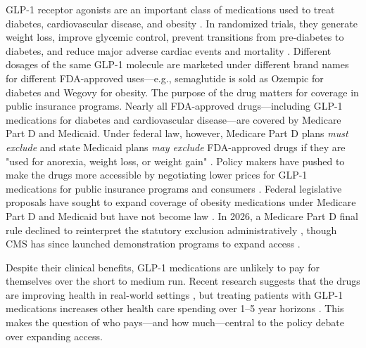 GLP-1 receptor agonists are an important class of medications used to treat diabetes, cardiovascular disease, and obesity \citep{Drucker2018}. In randomized trials, they generate weight loss, improve glycemic control, prevent transitions from pre-diabetes to diabetes, and reduce major adverse cardiac events and mortality \citep{Drucker2018, Marso2016a, Wilding2021, Jastreboff2022, lincoff2023semaglutide, le2017liraglutide, kahn2024semaglutide, jastreboff2025tirzepatide}. Different dosages of the same GLP-1 molecule are marketed under different brand names for different FDA-approved uses---e.g., semaglutide is sold as Ozempic for diabetes and Wegovy for obesity. The purpose of the drug matters for coverage in public insurance programs. Nearly all FDA-approved drugs---including GLP-1 medications for diabetes and cardiovascular disease---are covered by Medicare Part D and Medicaid. Under federal law, however, Medicare Part D plans \emph{must exclude} and state Medicaid plans \emph{may exclude} FDA-approved drugs if they are "used for anorexia, weight loss, or weight gain" \citep{SSA1860D2, SSA1927}. Policy makers have pushed to make the drugs more accessible by negotiating lower prices for GLP-1 medications for public insurance programs and consumers \citep{cms2025balance_page, WhiteHouseTrumpRx2025}. Federal legislative proposals have sought to expand coverage of obesity medications under Medicare Part D and Medicaid but have not become law \citep{TROA2025}. In 2026, a Medicare Part D final 
rule declined to reinterpret the statutory exclusion administratively \citep{CMSFinalRule2026}, though CMS has since launched demonstration programs to expand access \citep{cms2025balance_page}.

Despite their clinical benefits, GLP-1 medications are unlikely to pay for themselves over the short to medium run. Recent research suggests that the drugs are improving health in real-world settings \citep{zhang2026glp1, lu2025changes}, but treating patients with GLP-1 medications increases other health care spending over 1--5 year horizons \citep{wing2026glp1, wennberg2025glp1}. This makes the question of who pays---and how much---central to the policy debate over expanding access.


